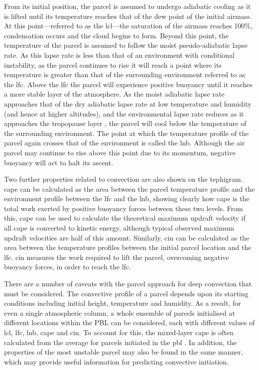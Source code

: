 From its initial position, the parcel is assumed to undergo adiabatic cooling as it is lifted until its temperature reaches that of the dew point of the initial airmass. 
At this point---referred to as the \acrshort{lcl}---the saturation of the airmass reaches 100\%, condensation occurs and the cloud begins to form. 
Beyond this point, the temperature of the parcel is assumed to follow the moist pseudo-adiabatic lapse rate. 
As this lapse rate is less than that of an environment with conditional instability, as the parcel continues to rise it will reach a point where its temperature is greater than that of the surrounding environment referred to as the \acrshort{lfc}. 
Above the \acrshort{lfc} the parcel will experience positive buoyancy until it reaches a more stable layer of the atmosphere. 
As the moist adiabatic lapse rate approaches that of the dry adiabatic lapse rate at low temperature and humidity (and hence at higher altitudes), and the environmental lapse rate reduces as it approaches the tropopause layer \citep{fueglistaler_tropical_2009}, the parcel will cool below the temperature of the surrounding environment. 
The point at which the temperature profile of the parcel again crosses that of the environment is called the \acrfull{lnb}. 
Although the air parcel may continue to rise above this point due to its momentum, negative buoyancy will act to halt its ascent.

Two further properties related to convection are also shown on the tephigram. 
\acrshort{cape} can be calculated as the area between the parcel temperature profile and the environment profile between the \acrshort{lfc} and the \acrshort{lnb}, showing clearly how \acrshort{cape} is the total work exerted by positive buoyancy forces between these two levels. 
From this, \acrshort{cape} can be used to calculate the theoretical maximum updraft velocity if all \acrshort{cape} is converted to kinetic energy, although typical observed maximum updraft velocities are half of this amount. 
Similarly, \acrfull{cin} can be calculated as the area between the temperature profiles between the initial parcel location and the \acrshort{lfc}. 
\acrshort{cin} measures the work required to lift the parcel, overcoming negative buoyancy forces, in order to reach the \acrshort{lfc}.

There are a number of caveats with the parcel approach for deep convection that must be considered. 
The convective profile of a parcel depends upon its starting conditions including initial height, temperature and humidity. 
As a result, for even a single atmospheric column, a whole ensemble of parcels initialised at different locations within the PBL can be considered, each with different values of \acrshort{lcl}, \acrshort{lfc}, \acrshort{lnb}, \acrshort{cape} and \acrshort{cin}. 
To account for this, the mixed-layer \acrshort{cape} is often calculated from the average for parcels initiated in the \acrshort{pbl} \citep{stull_practical_2016}. 
In addition, the properties of the most unstable parcel may also be found in the same manner, which may provide useful information for predicting convective initiation.

